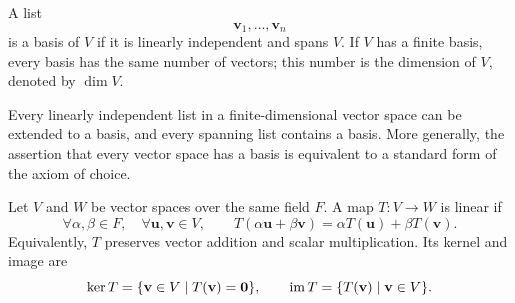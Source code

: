     \begin{definition}
        A list
        \[
            \mathbf{v}_1,\dots,\mathbf{v}_n
        \]
        is a basis of $V$ if it is linearly independent and spans $V$. If $V$
        has a finite basis, every basis has the same number of vectors; this
        number is the dimension of $V$, denoted by $\dim V$.
    \end{definition}

    \begin{theorem}
        Every linearly independent list in a finite-dimensional vector space
        can be extended to a basis, and every spanning list contains a basis.
        More generally, the assertion that every vector space has a basis is
        equivalent to a standard form of the axiom of choice.
    \end{theorem}

    \begin{definition}
        Let $V$ and $W$ be vector spaces over the same field $F$. A map
        $T\colon V\to W$ is linear if
        \[
            \forall\alpha,\beta\in F,
            \quad
            \forall\mathbf{u},\mathbf{v}\in V,
            \qquad
            T(\alpha\mathbf{u}+\beta\mathbf{v})
            =
            \alpha T(\mathbf{u})+\beta T(\mathbf{v}).
        \]
        Equivalently, $T$ preserves vector addition and scalar
        multiplication. Its kernel and image are
        \[
            \ker T=\{\mathbf{v}\in V\mid T(\mathbf{v})=\mathbf{0}\},
            \qquad
            \operatorname{im} T=\{T(\mathbf{v})\mid\mathbf{v}\in V\}.
        \]
    \end{definition}


